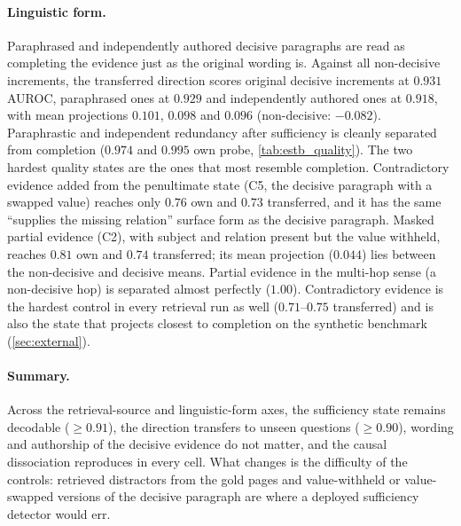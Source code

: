\paragraph{Linguistic form.} Paraphrased and independently authored decisive paragraphs are read as completing the evidence just as the original wording is. Against all non-decisive increments, the transferred \musique{} direction scores original decisive increments at $0.931$ AUROC, paraphrased ones at $0.929$ and independently authored ones at $0.918$, with mean projections $0.101$, $0.098$ and $0.096$ (non-decisive: $-0.082$). Paraphrastic and independent redundancy after sufficiency is cleanly separated from completion ($0.974$ and $0.995$ own probe, \cref{tab:estb_quality}). The two hardest quality states are the ones that most resemble completion. Contradictory evidence added from the penultimate state (C5, the decisive paragraph with a swapped value) reaches only $0.76$ own and $0.73$ transferred, and it has the same ``supplies the missing relation'' surface form as the decisive paragraph. Masked partial evidence (C2), with subject and relation present but the value withheld, reaches $0.81$ own and $0.74$ transferred; its mean projection ($0.044$) lies between the non-decisive and decisive means. Partial evidence in the multi-hop sense (a non-decisive hop) is separated almost perfectly ($1.00$). Contradictory evidence is the hardest control in every retrieval run as well ($0.71$--$0.75$ transferred) and is also the state that projects closest to completion on the synthetic benchmark (\cref{sec:external}).

\paragraph{Summary.} Across the retrieval-source and linguistic-form axes, the sufficiency state remains decodable ($\ge0.91$), the \musique{} direction transfers to unseen questions ($\ge0.90$), wording and authorship of the decisive evidence do not matter, and the causal dissociation reproduces in every cell. What changes is the difficulty of the controls: retrieved distractors from the gold pages and value-withheld or value-swapped versions of the decisive paragraph are where a deployed sufficiency detector would err.

